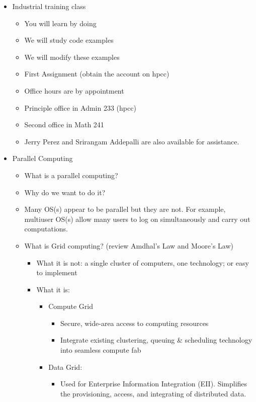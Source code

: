 \begin{itemize}
\begin{itemize}
\end{itemize}
\item Industrial training class 
\begin{itemize}
\item You will learn by doing 
\item We will study code examples
\item We will modify these examples 
\item First Assignment  (obtain the account on hpcc)
\item Office hours are by appointment
\item Principle office in Admin 233 (hpcc) 
\item Second office in Math 241
\item Jerry Perez and Srirangam Addepalli are also available for assistance.  
\end{itemize}
\item Parallel Computing
\begin{itemize}
\item What is a parallel computing?
\item Why do we want to do it?
\item Many OS(s) appear to be parallel but they are not.  For example, multiuser OS(s) allow many users to log on simultaneously and carry out computations.
\item What is Grid computing?   (review Amdhal's Law and Moore's Law)

\begin{itemize}
\item What it is not: a single cluster of computers, one technology; or easy to implement
\item What it is:
\begin{itemize}
\item Compute Grid
\begin{itemize}
\item Secure, wide-area access to computing resources
\item Integrate existing clustering, queuing \& scheduling technology into seamless compute fab
\end{itemize}
\item Data Grid:
\begin{itemize}
\item Used for Enterprise Information Integration (EII). Simplifies the provisioning, access, and integrating of distributed data.
\end{itemize}

\end{itemize}



\end{itemize}
\end{itemize}
\end{itemize}

